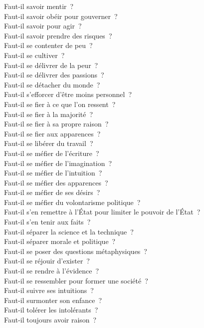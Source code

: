 \documentclass[a4paper,12pt]{article}
\begin{document}
Faut-il savoir mentir ? \\
Faut-il savoir obéir pour gouverner ? \\
Faut-il savoir pour agir ? \\
Faut-il savoir prendre des risques ? \\
Faut-il se contenter de peu ? \\
Faut-il se cultiver ? \\
Faut-il se délivrer de la peur ? \\
Faut-il se délivrer des passions ? \\
Faut-il se détacher du monde ? \\
Faut-il s'efforcer d'être moins personnel ? \\
Faut-il se fier à ce que l'on ressent ? \\
Faut-il se fier à la majorité ? \\
Faut-il se fier à sa propre raison ? \\
Faut-il se fier aux apparences ? \\
Faut-il se libérer du travail ? \\
Faut-il se méfier de l'écriture ? \\
Faut-il se méfier de l'imagination ? \\
Faut-il se méfier de l'intuition ? \\
Faut-il se méfier des apparences ? \\
Faut-il se méfier de ses désirs ? \\
Faut-il se méfier du volontarisme politique ? \\
Faut-il s'en remettre à l'État pour limiter le pouvoir de l'État ? \\
Faut-il s'en tenir aux faits ? \\
Faut-il séparer la science et la technique ? \\
Faut-il séparer morale et politique ? \\
Faut-il se poser des questions métaphysiques ? \\
Faut-il se réjouir d'exister ? \\
Faut-il se rendre à l'évidence ? \\
Faut-il se ressembler pour former une société ? \\
Faut-il suivre ses intuitions ? \\
Faut-il surmonter son enfance ? \\
Faut-il tolérer les intolérants ? \\
Faut-il toujours avoir raison ? \\
\end{document}
